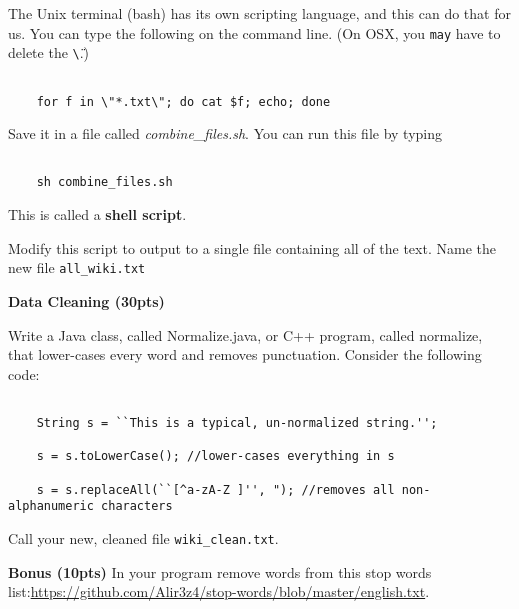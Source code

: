 \documentclass[10pt]{article}
\newenvironment{problem}[2][Problem]{\begin{trivlist}

\item[\hskip \labelsep {\bfseries #1}\hskip \labelsep {\bfseries #2.}]}{\end{trivlist}}
\begin{document}
\begin{problem}{1}
\begin{verbatim}
\end{verbatim}



The Unix terminal (bash) has its own scripting language, and this can do that for us.  You can type the following on the command line. (On OSX, you \texttt{may} have to delete the \texttt{\textbackslash\"}.)



\begin{verbatim}

    for f in \"*.txt\"; do cat $f; echo; done

\end{verbatim}

Save it in a file called \textit{combine\_files.sh}.  You can run this file by typing 

 \begin{verbatim}

    sh combine_files.sh

\end{verbatim}

This is called a \textbf{shell script}. 

Modify this script to output to a single file containing all of the text.  Name the new file \texttt{all\_wiki.txt}

\end{problem}

\begin{problem}{Part 2} 

\textbf{Data Cleaning (30pts)}

Write a Java class, called Normalize.java, or C++ program, called normalize, that lower-cases every word and removes punctuation.  Consider the following code:  

\begin{verbatim}

    String s = ``This is a typical, un-normalized string.'';

    s = s.toLowerCase(); //lower-cases everything in s

    s = s.replaceAll(``[^a-zA-Z ]'', "); //removes all non-alphanumeric characters

\end{verbatim}

Call your new, cleaned file \texttt{wiki\_clean.txt}.



\textbf{Bonus (10pts)} In your program remove words from this stop words list:\url{https://github.com/Alir3z4/stop-words/blob/master/english.txt}.

\end{problem}
\end{document}
